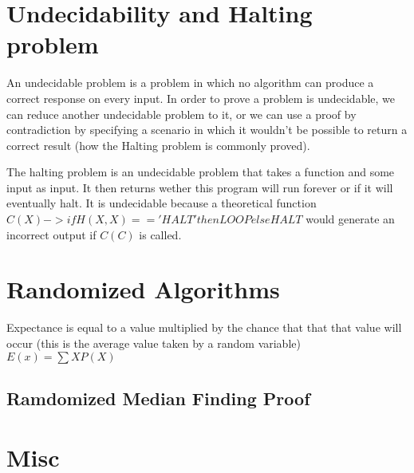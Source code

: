 \documentclass{article}
\begin{document}
\section{Undecidability and Halting problem}
An undecidable problem is a problem in which no algorithm can produce a correct response on every
input. In order to prove a problem is undecidable, we can reduce another undecidable problem to it, 
or we can use a proof by contradiction by specifying a scenario in which it wouldn't be possible
to return a correct result (how the Halting problem is commonly proved).

The halting problem is an undecidable problem that takes a function and some input as input. It then returns
wether this program will run forever or if it will eventually halt. It is undecidable because a theoretical
function $C(X) -> if H(X,X) == 'HALT' then LOOP else HALT$ would generate an incorrect output if $C(C)$ is called.


\section{Randomized Algorithms}
Expectance is equal to a value multiplied by the chance that that that value will occur
(this is the average value taken by a random variable)$E(x) = \sum XP(X)$

\subsection{Ramdomized Median Finding Proof}

\section{Misc}
\end{document}
